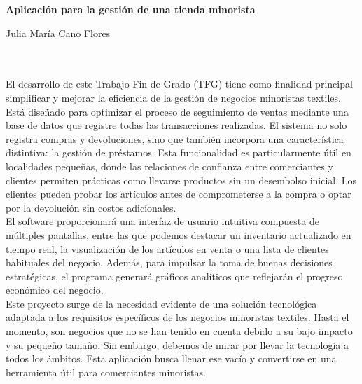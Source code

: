 %


\cleardoublepage

\begin{center}
{\large\bfseries Aplicación para la gestión de una tienda minorista}\\
\end{center}
\begin{center}
Julia María Cano Flores\\
\end{center}

\vspace{0.7cm}
\\

\vspace{0.7cm}
\\

El desarrollo de este Trabajo Fin de Grado (TFG) tiene como finalidad principal simplificar y mejorar la eficiencia de la gestión de negocios minoristas textiles. Está diseñado para optimizar el proceso de seguimiento de ventas mediante una base de datos que registre todas las transacciones realizadas. El sistema no solo registra compras y devoluciones, sino que también incorpora una característica distintiva: la gestión de préstamos. Esta funcionalidad es particularmente útil en localidades pequeñas, donde las relaciones de confianza entre comerciantes y clientes permiten prácticas como llevarse productos sin un desembolso inicial. Los clientes pueden probar los artículos antes de comprometerse a la compra o optar por la devolución sin costos adicionales.\\


El software proporcionará una interfaz de usuario intuitiva compuesta de múltiples pantallas, entre las que podemos destacar un inventario actualizado en tiempo real, la visualización de los artículos en venta o una lista de clientes habituales del negocio. Además, para impulsar la toma de buenas decisiones estratégicas, el programa generará gráficos analíticos que reflejarán el progreso económico del negocio. \\

Este proyecto surge de la necesidad evidente de una solución tecnológica adaptada a los requisitos específicos de los negocios minoristas textiles. Hasta el momento, son negocios que no se han tenido en cuenta debido a su bajo impacto y su pequeño tamaño. Sin embargo, debemos de mirar por llevar la tecnología a todos los ámbitos. Esta aplicación busca llenar ese vacío y convertirse en una herramienta útil para comerciantes minoristas.  


